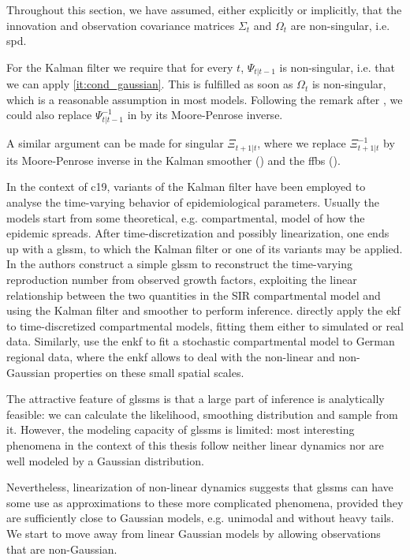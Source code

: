 \begin{remark}
    \label{rem:regular_covs}
    Throughout this section, we have assumed, either explicitly or implicitly, that the innovation and observation covariance matrices $\Sigma_{t}$ and $\Omega_{t}$ are non-singular, i.e. \acrshort{spd}.

    For the Kalman filter we require that for every $t$, $\Psi_{t|t-1}$ is non-singular, i.e. that we can apply  \ref{it:cond_gaussian}. This is fulfilled as soon as $\Omega_{t}$ is non-singular, which is a reasonable assumption in most models. Following the remark after , we could also replace $\Psi_{t|t-1}^{-1}$ in  by its Moore-Penrose inverse. 

    A similar argument can be made for singular $\Xi_{t+1|t}$, where we replace $\Xi_{t+1|t}^{-1}$ by its Moore-Penrose inverse in the Kalman smoother () and the \acrshort{ffbs} (). 
\end{remark}

In the context of \acrshort{c19}, variants of the Kalman filter have been employed to analyse the time-varying behavior of epidemiological parameters. Usually the models start from some theoretical, e.g. compartmental, model of how the epidemic spreads. After time-discretization and possibly linearization, one ends up with a \acrshort{glssm}, to which the Kalman filter or one of its variants may be applied. 
In \citep{Arroyo-Marioli2021Tracking} the authors construct a simple \acrshort{glssm} to reconstruct the time-varying reproduction number from observed growth factors, exploiting the linear relationship between the two quantities in the SIR compartmental model and using the Kalman filter and smoother to perform inference. 
\citep{Zhu2021Extended,Song2021Maximum} directly apply the \acrshort{ekf} to time-discretized compartmental models, fitting them either to simulated \citep{Zhu2021Extended} or real \citep{Song2021Maximum} data. Similarly, \citep{Engbert2020Sequential} use the \acrshort{enkf} to fit a stochastic compartmental model to German regional data, where the \acrshort{enkf} allows to deal with the non-linear and non-Gaussian properties on these small spatial scales.

The attractive feature of \glspl{glssm} is that a large part of inference is analytically feasible: we can calculate the likelihood, smoothing distribution and sample from it. 
However, the modeling capacity of \glspl{glssm} is limited: most interesting phenomena in the context of this thesis follow neither linear dynamics nor are well modeled by a Gaussian distribution.

Nevertheless, linearization of non-linear dynamics suggests that \gls{glssm}s can have some use as approximations to these more complicated phenomena, provided they are sufficiently close to Gaussian models, e.g. unimodal and without heavy tails.
We start to move away from linear Gaussian models by allowing observations that are non-Gaussian.